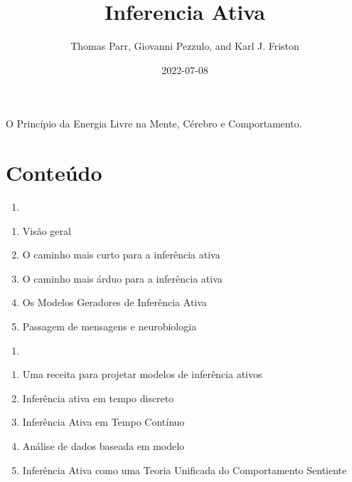 \documentclass[
  12pt,
]{book}
\title{Inferencia Ativa}
\author{Thomas Parr, Giovanni Pezzulo, and Karl J. Friston}
\date{2022-07-08}
\providecommand{\tightlist}{%
  \setlength{\itemsep}{0pt}\setlength{\parskip}{0pt}}
\begin{document}
\maketitle

{
\hypersetup{linkcolor=}
\setcounter{tocdepth}{1}
\tableofcontents
}
\listoffigures
\listoftables
O Princípio da Energia Livre na Mente, Cérebro e Comportamento.

\hypertarget{conteuxfado}{%
\chapter*{Conteúdo}\label{conteuxfado}}

\begin{enumerate}
\def\labelenumi{(\Roman{enumi})}
\tightlist
\item
\end{enumerate}

\begin{enumerate}
\def\labelenumi{\arabic{enumi}.}
\tightlist
\item
  Visão geral\\
\item
  O caminho mais curto para a inferência ativa\\
\item
  O caminho mais árduo para a inferência ativa\\
\item
  Os Modelos Geradores de Inferência Ativa\\
\item
  Passagem de mensagens e neurobiologia
\end{enumerate}

\begin{enumerate}
\def\labelenumi{(\Roman{enumi})}
\setcounter{enumi}{1}
\tightlist
\item
\end{enumerate}

\begin{enumerate}
\def\labelenumi{\arabic{enumi}.}
\setcounter{enumi}{5}
\tightlist
\item
  Uma receita para projetar modelos de inferência ativos
\item
  Inferência ativa em tempo discreto
\item
  Inferência Ativa em Tempo Contínuo
\item
  Análise de dados baseada em modelo
\item
  Inferência Ativa como uma Teoria Unificada do Comportamento Sentiente
\end{enumerate}
\end{document}
